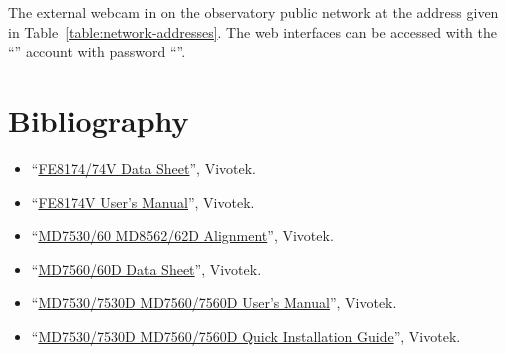 The external webcam in on the observatory public network at the address given in Table~\ref{table:network-addresses}. The web interfaces can be accessed with the “\projectaccount” account with password “\projectaccount”.

\section{Bibliography}

\begin{flushleft}
\begin{itemize}
\item “\href{bibliography/vivotek-fe8174v-data-sheet.pdf}{FE8174/74V Data Sheet}”, Vivotek.
\item “\href{bibliography/vivotek-fe8174v-manual.pdf}{FE8174V User’s Manual}”, Vivotek.
\item “\href{bibliography/vivotek-md7560-alignment-sticker.pdf}{MD7530/60 MD8562/62D Alignment}”, Vivotek.
\item “\href{bibliography/vivotek-md7560-data-sheet.pdf}{MD7560/60D Data Sheet}”, Vivotek.
\item “\href{bibliography/vivotek-md7560-manual.pdf}{MD7530/7530D MD7560/7560D User’s Manual}”, Vivotek.
\item “\href{bibliography/vivotek-md7560-quick-instaltion-guide.pdf}{MD7530/7530D MD7560/7560D Quick Installation Guide}”, Vivotek.
\end{itemize}
\end{flushleft}

